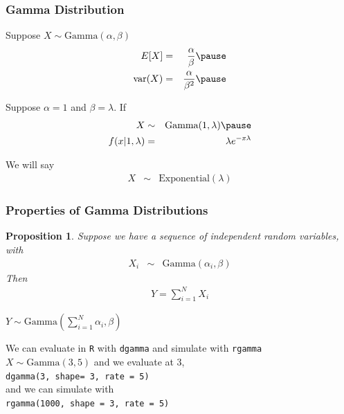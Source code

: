 \documentclass{beamer}
\newtheorem{prop}{Proposition}
\numberwithin{equation}{section}
\begin{document}
\begin{frame}
\frametitle{Gamma Distribution}

Suppose $X \sim \text{Gamma}(\alpha, \beta)$ \pause 
\begin{eqnarray}
E[X] & = & \frac{\alpha}{\beta} \nonumber \pause\\
\text{var}(X) & = & \frac{\alpha}{\beta^2} \nonumber \pause\\
\end{eqnarray}



Suppose $\alpha = 1$ and $\beta = \lambda$.  If \pause\\
\begin{eqnarray}
X & \sim & \text{Gamma}(1, \lambda) \nonumber \pause\\
f(x|1, \lambda ) & = & \lambda e^{- x \lambda}  \nonumber
\end{eqnarray}



We will say \pause 
\begin{eqnarray}
X & \sim & \text{Exponential}(\lambda) \nonumber 
\end{eqnarray}


\end{frame}

\begin{frame}
\frametitle{Properties of Gamma Distributions}

\begin{prop}
Suppose we have a sequence of independent random variables, with 
\begin{eqnarray}
X_{i} & \sim & \text{Gamma}(\alpha_{i}, \beta) \nonumber 
\end{eqnarray}
Then 
\begin{eqnarray}
Y = \sum_{i=1}^{N} X_{i} \nonumber 
\end{eqnarray}

$Y \sim \text{Gamma}(\sum_{i=1}^{N} \alpha_{i} , \beta) $


\end{prop}


\end{frame}





\begin{frame}
We can evaluate in {\tt R} with {\tt dgamma} and simulate with {\tt rgamma}\\

$X \sim \text{Gamma}(3, 5)$ and we evaluate at 3, \\
{\tt dgamma(3, shape= 3, rate = 5)}\\
and we can simulate with \\
{\tt rgamma(1000, shape = 3, rate = 5)} 




\end{frame}
\end{document}
